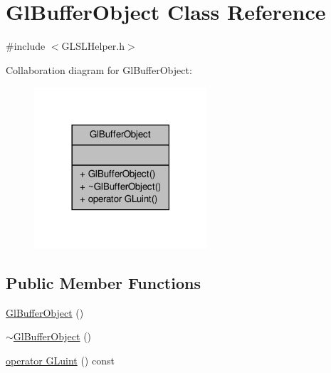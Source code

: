\hypertarget{classGlBufferObject}{\section{Gl\-Buffer\-Object Class Reference}
\label{classGlBufferObject}
}


{\ttfamily \#include $<$G\-L\-S\-L\-Helper.\-h$>$}



Collaboration diagram for Gl\-Buffer\-Object\-:
\nopagebreak
\begin{figure}[H]
\begin{center}
\leavevmode
\includegraphics[width=182pt]{classGlBufferObject__coll__graph}
\end{center}
\end{figure}
\subsection*{Public Member Functions}
\begin{DoxyCompactItemize}
\item 
\hyperlink{classGlBufferObject_a5346228ff9f5b1c806a9d03ece525dbb}{Gl\-Buffer\-Object} ()
\item 
\hyperlink{classGlBufferObject_a046d6e2874c10d04aa16e4846b1e93d7}{$\sim$\-Gl\-Buffer\-Object} ()
\item 
\hyperlink{classGlBufferObject_a0f71903669c77f142202c62b897a5c00}{operator G\-Luint} () const 
\end{DoxyCompactItemize}


